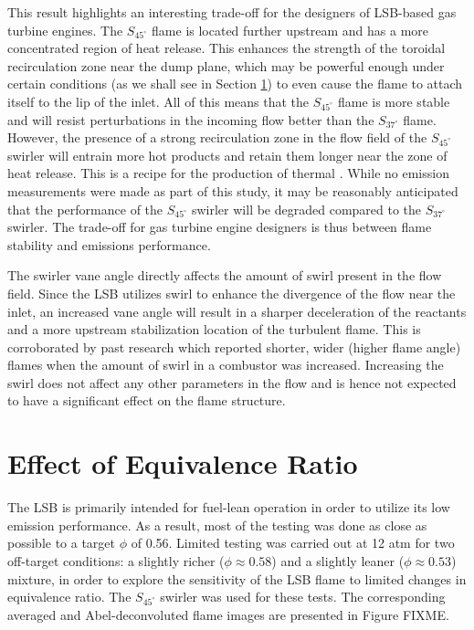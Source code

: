 This result highlights an interesting trade-off for the designers of LSB-based gas turbine engines.
The \(S_{45^\circ}\) flame is located further upstream and has a more concentrated region of heat release.
This enhances the strength of the toroidal recirculation zone near the dump plane, which may be powerful enough under certain conditions (as we shall see in Section \ref{sec:lsb-effect-of-equivalence-ratio}) to even cause the flame to attach itself to the lip of the inlet.
All of this means that the \(S_{45^\circ}\) flame is more stable and will resist perturbations in the incoming flow better than the \(S_{37^\circ}\) flame.
However, the presence of a strong recirculation zone in the flow field of the \(S_{45^\circ}\) swirler will entrain more hot products and retain them longer near the zone of heat release.
This is a recipe for the production of thermal .
While no emission measurements were made as part of this study, it may be reasonably anticipated that the  performance of the \(S_{45^\circ}\) swirler will be degraded compared to the \(S_{37^\circ}\) swirler.
The trade-off for gas turbine engine designers is thus between flame stability and emissions performance.

The swirler vane angle directly affects the amount of swirl present in the flow field.
Since the LSB utilizes swirl to enhance the divergence of the flow near the inlet, an increased vane angle will result in a sharper deceleration of the reactants and a more upstream stabilization location of the turbulent flame.
This is corroborated by past research\cite{1986-starner} which reported shorter, wider (higher flame angle) flames when the amount of swirl in a combustor was increased.
Increasing the swirl does not affect any other parameters in the flow and is hence not expected to have a significant effect on the flame structure.

\section{Effect of Equivalence Ratio}
\label{sec:lsb-effect-of-equivalence-ratio}

The LSB is primarily intended for fuel-lean operation in order to utilize its low  emission performance.
As a result, most of the testing was done as close as possible to a target \(\phi\) of 0.56.
Limited testing was carried out at 12 atm for two off-target conditions: a slightly richer (\(\phi \approx 0.58\)) and a slightly leaner (\(\phi \approx 0.53\)) mixture, in order to explore the sensitivity of the LSB flame to limited changes in equivalence ratio.
The \(S_{45^\circ}\) swirler was used for these tests.
The corresponding averaged and Abel-deconvoluted flame images are presented in Figure FIXME.

